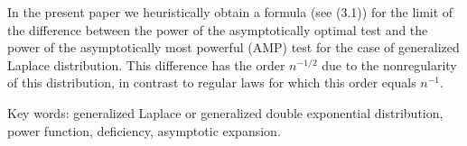 In the present paper we
heuristically obtain a formula (see (3.1)) for the limit of
the difference between the  power of the asymptotically optimal test and
the power of the asymptotically most powerful (AMP) test for the case
of generalized Laplace
distribution. This difference has the order $n^{-1/2}$ due to the
nonregularity of this distribution, in contrast to regular laws
for which this order equals  $n^{-1}$.
\par Key words: generalized Laplace or
generalized double exponential distribution, power
function, deficiency, asymptotic expansion.